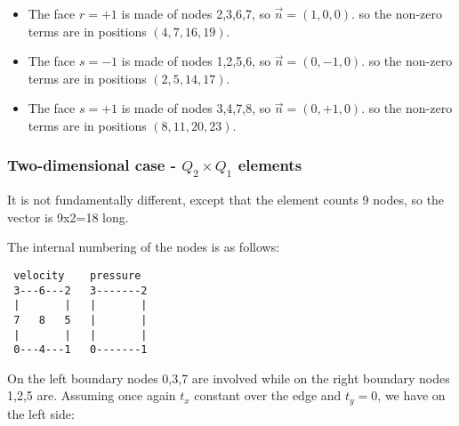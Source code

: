\begin{itemize}
{\[\begin{array}{c}
0\\
0\\
0\\
0\\
0\\
1\\
0\\
0\\
1\\
0\\
0\\
0\\
0\\
0\\
0\\
0\\
0\\
1\\
0\\
0
\end{array}
\right)
\]
}


\item
The face $r=+1$ is made of nodes 2,3,6,7, so $\vec{n}=(1,0,0)$.
so the non-zero terms are in positions $(4,7,16,19)$.

\item
The face $s=-1$ is made of nodes 1,2,5,6, so $\vec{n}=(0,-1,0)$.
so the non-zero terms are in positions $(2,5,14,17)$.

\item
The face $s=+1$ is made of nodes 3,4,7,8, so $\vec{n}=(0,+1,0)$.
so the non-zero terms are in positions $(8,11,20,23)$.

\end{itemize}


\subsubsection{Two-dimensional case - $Q_2 \times Q_1$ elements}

It is not fundamentally different, except that the element counts 9 nodes, 
so the vector is 9x2=18 long. 

The internal numbering of the nodes is as follows:
\begin{verbatim}
 velocity    pressure
 3---6---2   3-------2
 |       |   |       |
 7   8   5   |       |
 |       |   |       |
 0---4---1   0-------1
\end{verbatim}

On the left boundary nodes 0,3,7 are involved while on the right 
boundary nodes 1,2,5 are.
Assuming once again $t_x$ constant over the edge and $t_y=0$, we
have on the left side:

